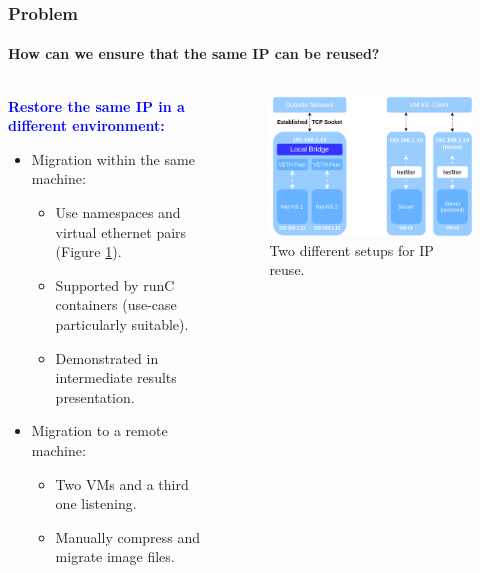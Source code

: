 \documentclass[9pt,    %
    english,            %
    xcolor=table,       %
    envcountsect,        %
    aspectratio=169     %
]{beamer}
\begin{document}
\begin{frame}
    \frametitle{Problem}
    \framesubtitle{How can we ensure that the same IP can be reused?}

    \begin{columns}
        \begin{column}{.45\textwidth}
            \textbf{\textcolor{blue}{Restore the same IP in a different environment:}}
            \begin{itemize}
                \item Migration within the same machine:
                \begin{itemize}
                    \item Use namespaces and virtual ethernet pairs (Figure \ref{fig:architecture}).
                    \item Supported by runC containers (use-case particularly suitable).
                    \item Demonstrated in intermediate results presentation.
                \end{itemize}
                \vspace{5pt}
                \item Migration to a remote machine:
                \begin{itemize}
                    \item Two VMs and a third one listening.
                    \item Manually compress and migrate image files.
                \end{itemize}
            \end{itemize}
        \end{column}
        \begin{column}{.55\textwidth}
            \vspace{-20pt}
            \begin{figure}[t!]
                \includegraphics[width=.85\textwidth]{./images/architecture.png}
                \caption{Two different setups for IP reuse.\label{fig:architecture}}
            \end{figure}
        \end{column}
    \end{columns}
    
\end{frame}
\end{document}
